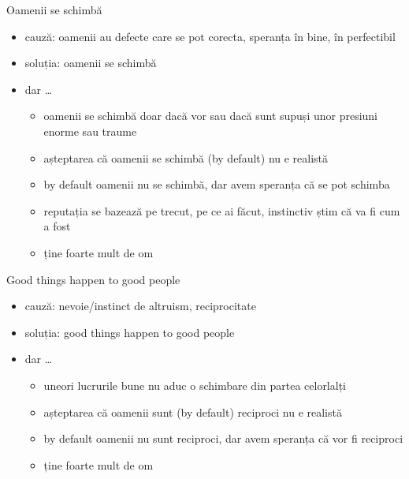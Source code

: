 \documentclass{beamer}
\begin{document}
\begin{frame}{Oamenii se schimbă}
  \begin{itemize}
    \pause \item cauză: oamenii au defecte care se pot corecta, speranța în bine, în perfectibil
    \pause \item soluția: oamenii se schimbă
    \pause \item dar \ldots
      \begin{itemize}
        \pause \item oamenii se schimbă doar dacă vor sau dacă sunt supuși unor presiuni enorme sau traume
        \pause \item așteptarea că oamenii se schimbă (by default) nu e realistă
        \pause \item by default oamenii nu se schimbă, dar avem speranța că se pot schimba
        \pause \item reputația se bazează pe trecut, pe ce ai făcut, instinctiv știm că va fi cum a fost
        \pause \item ține foarte mult de om
      \end{itemize}
  \end{itemize}
\end{frame}

\begin{frame}{Good things happen to good people}
  \begin{itemize}
    \pause \item cauză: nevoie/instinct de altruism, reciprocitate
    \pause \item soluția: good things happen to good people
    \pause \item dar \ldots
      \begin{itemize}
        \pause \item uneori lucrurile bune nu aduc o schimbare din partea celorlalți
        \pause \item așteptarea că oamenii sunt (by default) reciproci nu e realistă
        \pause \item by default oamenii nu sunt reciproci, dar avem speranța că vor fi reciproci
        \pause \item ține foarte mult de om
      \end{itemize}
  \end{itemize}
\end{frame}
\end{document}

